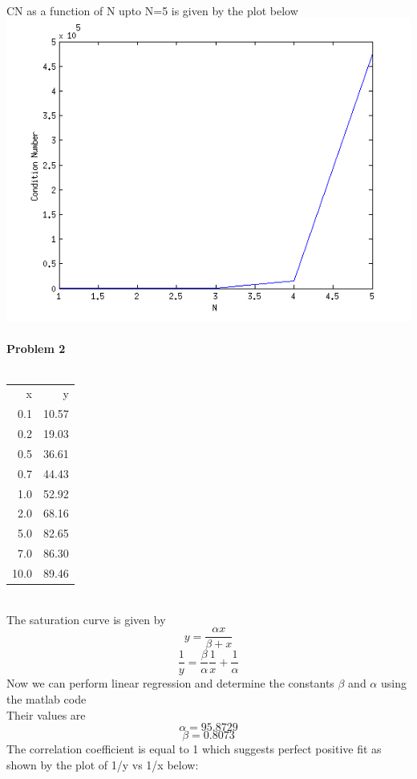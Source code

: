 \documentclass[a4paper,12pt]{article}
\begin{document}
\newpage
\textbf{ } \\
CN as a function of N upto N=5 is given by the plot below\\
\includegraphics [keepaspectratio=true] {2norm.png}
\\
\\
\textbf{Problem 2} \\
\\
\begin{tabular}{ r r }
 x & y\\
    0.1 & 10.57 \\
    0.2 & 19.03 \\
    0.5 & 36.61 \\ 
    0.7 & 44.43 \\
    1.0 & 52.92 \\
    2.0 & 68.16 \\
    5.0 & 82.65 \\
    7.0 & 86.30 \\
   10.0 & 89.46 \\
\end{tabular}
\newpage
\textbf{ } \\
The saturation curve is given by\\
\[ y = \frac{\alpha x}{\beta + x}  \]
\[ \frac{1}{y} = \frac{\beta}{\alpha} \frac {1}{x} + \frac{1}{\alpha}  \]
Now we can perform linear regression and determine the constants $\beta$ and $\alpha$ using the matlab code\\
Their values are\\
\[ \alpha =  95.8729 \]
\[ \beta =  0.8073 \]
The correlation coefficient is equal to 1 which suggests perfect positive fit as shown by the plot of 1/y vs 1/x below:\\
\end{document}
